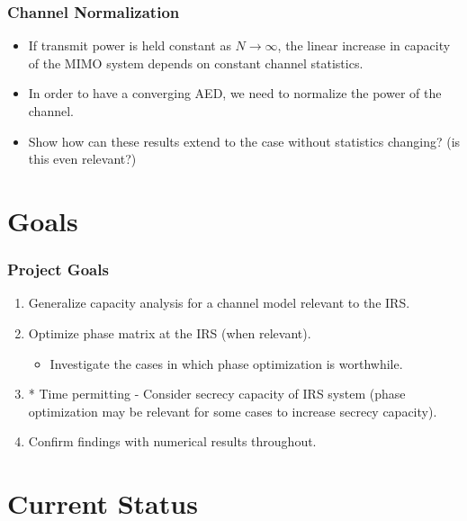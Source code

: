 \documentclass[10pt,tgadventor, onlymath]{beamer}
\begin{document}
\begin{frame}
\frametitle{Channel Normalization}
	\begin{itemize}
		\item 
			If transmit power is held constant as $N \rightarrow \infty$, the linear increase in capacity of the MIMO system depends on constant channel statistics.
		\item 
			In order to have a converging AED, we need to normalize the power of the channel.
		\item
			Show how can these results extend to the case without statistics changing? (is this even relevant?)
	\end{itemize}
\end{frame}

\section{Goals}
\begin{frame}
\frametitle{Project Goals}
\begin{enumerate}
\item
	Generalize capacity analysis for a channel model relevant to the IRS.
\item 
	Optimize phase matrix at the IRS (when relevant).
	\begin{itemize}
	\item
		Investigate the cases in which phase optimization is worthwhile. 
	\end{itemize}
\item
	* Time permitting - Consider secrecy capacity of IRS system (phase optimization may be relevant for some cases to increase secrecy capacity).
\item 
	Confirm findings with numerical results throughout.
\end{enumerate}
\end{frame}
\section{Current Status}
\end{document}
